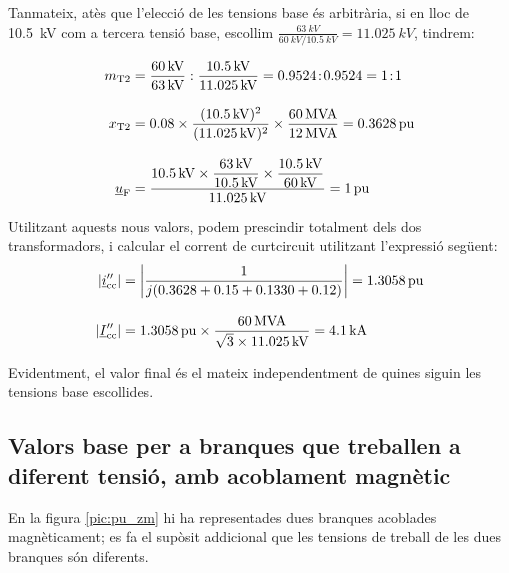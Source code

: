 \begin{exemple}[\MetodeCalculPU{}]
     Tanmateix, atès que l'elecció de les tensions base és
     arbitrària, si en lloc de \qty{10,5}{kV} com a tercera tensió base,
     escollim
     $\frac{\qty{63}{kV}}{\qty{60}{kV} / \qty{10,5}{kV}}=\qty{11,025}{kV}$,
     tindrem:

    \begin{align*}
       m_\mathrm{T2} &= \frac{\qty{60}{kV}}{\qty{63}{kV}} : \frac{\qty{10,5}{kV}}{\qty{11,025}{kV}}
       = \num{0,9524}\!:\!\num{0,9524} = 1\!:\!1 \\[3mm]
       x_\mathrm{T2} &= \num{0,08} \times \frac{(\qty{10,5}{kV})^2}{(\qty{11,025}{kV})^2 } \times
       \frac{\qty{60}{MVA}}{\qty{12}{MVA}}  = \qty{0,3628}{pu}\\[3mm]
       \underline{u}_\mathrm{F} &= \frac{\qty{10,5}{kV} \times \dfrac{\qty{63}{kV}}{\qty{10,5}{kV}} \times
       \dfrac{\qty{10,5}{kV}}{\qty{60}{kV}}}{\qty{11,025}{kV}} = \qty{1}{pu}
    \end{align*}

    Utilitzant aquests nous valors, podem prescindir totalment dels dos
    transformadors, i calcular el corrent de curtcircuit utilitzant
    l'expressió següent:
    \begin{align*}
    |\underline{i}''_\mathrm{cc}| &= \left| \frac{1}{j ( \num{0,3628} + \num{0,15} +
    \num{0,1330} + \num{0,12} )} \right| = \qty{1,3058}{pu} \\[3mm]
    |\underline{I}''_\mathrm{cc}| &=
    \qty{1,3058}{pu}\times\frac{\qty{60}{MVA}}{\sqrt{3}\times \qty{11,025}{kV}} =
    \qty{4,1}{kA}
    \end{align*}

    Evidentment, el valor final és el mateix independentment de quines
    siguin les tensions base escollides.
\end{exemple}

\subsection{Valors base per a branques que treballen a diferent tensió, amb acoblament magnètic}

En la figura \vref{pic:pu_zm} hi ha representades dues branques acoblades magnèticament; es fa el supòsit addicional que les tensions de treball de les dues branques són diferents.

\begin{center}
    
    \label{pic:pu_zm}
\end{center}

